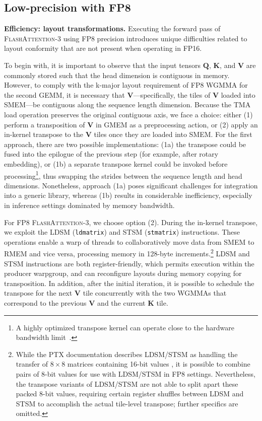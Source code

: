 \subsection{Low-precision with FP8}
\label{sec:algofp8}

\textbf{Efficiency: layout transformations.} Executing the forward pass of \textsc{FlashAttention-3} using FP8 precision introduces unique difficulties related to layout conformity that are not present when operating in FP16.

To begin with, it is important to observe that the input tensors $\mathbf{Q}$, $\mathbf{K}$, and $\mathbf{V}$ are commonly stored such that the head dimension is contiguous in memory. However, to comply with the k-major layout requirement of FP8 WGMMA for the second GEMM, it is necessary that $\mathbf{V}$—specifically, the tiles of $\mathbf{V}$ loaded into SMEM—be contiguous along the sequence length dimension. Because the TMA load operation preserves the original contiguous axis, we face a choice: either (1) perform a transposition of $\mathbf{V}$ in GMEM as a preprocessing action, or (2) apply an in-kernel transpose to the $\mathbf{V}$ tiles once they are loaded into SMEM. For the first approach, there are two possible implementations: (1a) the transpose could be fused into the epilogue of the previous step (for example, after rotary embedding), or (1b) a separate transpose kernel could be invoked before processing\footnote{A highly optimized transpose kernel can operate close to the hardware bandwidth limit~\citep{colfax_cutlass_transpose_2024}.}, thus swapping the strides between the sequence length and head dimensions. Nonetheless, approach (1a) poses significant challenges for integration into a generic library, whereas (1b) results in considerable inefficiency, especially in inference settings dominated by memory bandwidth.

For FP8 \textsc{FlashAttention-3}, we choose option (2). During the in-kernel transpose, we exploit the LDSM (\verb|ldmatrix|) and STSM (\verb|stmatrix|) instructions. These operations enable a warp of threads to collaboratively move data from SMEM to RMEM and vice versa, processing memory in 128-byte increments.\footnote{While the PTX documentation describes LDSM/STSM as handling the transfer of $8 \times 8$ matrices containing 16-bit values \cite[\S 9.7.13.4.15-16]{ptx}, it is possible to combine pairs of 8-bit values for use with LDSM/STSM in FP8 settings. Nevertheless, the transpose variants of LDSM/STSM are not able to split apart these packed 8-bit values, requiring certain register shuffles between LDSM and STSM to accomplish the actual tile-level transpose; further specifics are omitted.} LDSM and STSM instructions are both register-friendly, which permits execution within the producer warpgroup, and can reconfigure layouts during memory copying for transposition. In addition, after the initial iteration, it is possible to schedule the transpose for the next $\mathbf{V}$ tile concurrently with the two WGMMAs that correspond to the previous $\mathbf{V}$ and the current $\mathbf{K}$ tile.


